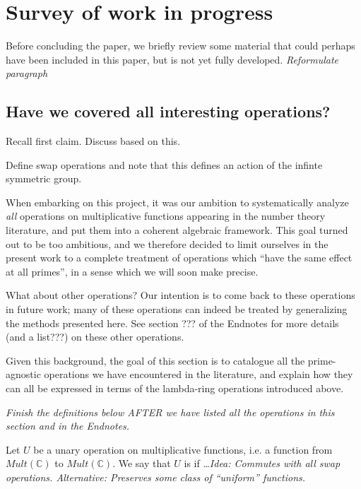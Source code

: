 
\section{Survey of work in progress}

Before concluding the paper, we briefly review some material that could perhaps have been included in this paper, but is not yet fully developed.  \emph{Reformulate paragraph}

\subsection{Have we covered all interesting operations?}

Recall first claim. Discuss based on this. 

Define swap operations and note that this defines an action of the infinte symmetric group.

When embarking on this project, it was our ambition to systematically analyze \emph{all} operations on multiplicative functions appearing in the number theory literature, and put them into a coherent algebraic framework. This goal turned out to be too ambitious, and we therefore decided to limit ourselves in the present work to a complete treatment of operations which ``have the same effect at all primes'', in a sense which we will soon make precise.

What about other operations? Our intention is to come back to these operations in future work; many of these operations can indeed be treated by generalizing the methods presented here. See section ??? of the Endnotes for more details (and a list???) on these other operations. 

Given this background, the goal of this section is to catalogue all the prime-agnostic operations we have encountered in the literature, and explain how they can all be expressed in terms of the lambda-ring operations introduced above.

\emph{Finish the definitions below AFTER we have listed all the operations in this section and in the Endnotes.}

\begin{definition}
Let $U$ be a unary operation on multiplicative functions, i.e. a function from $Mult(\mathbb{C})$ to $Mult(\mathbb{C})$. We say that $U$ is  if \ldots \emph{Idea: Commutes with all swap operations. Alternative: Preserves some class of ``uniform'' functions.}
\end{definition}

